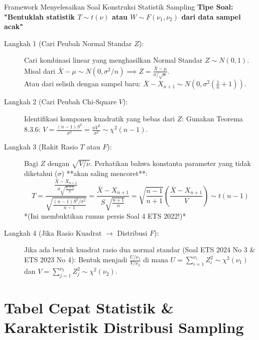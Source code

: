 \documentclass[10pt,twoside]{article}
\begin{document}
\begin{stepbox}{Framework Menyelesaikan Soal Konstruksi Statistik Sampling}
\textbf{Tipe Soal: "Bentuklah statistik $T \sim t(\nu)$ atau $W \sim F(\nu_1, \nu_2)$ dari data sampel acak"}
\begin{description}
  \item[Langkah 1 (Cari Peubah Normal Standar $Z$):]
    Cari kombinasi linear yang menghasilkan Normal Standar $Z \sim N(0, 1)$.
    Misal dari $\bar{X} - \mu \sim N(0, \sigma^2/n) \implies Z = \frac{\bar{X} - \mu}{\sigma/\sqrt{n}}$.\\
    Atau dari selisih dengan sampel baru: $\bar{X} - X_{n+1} \sim N\left(0, \sigma^2\left(\frac{1}{n} + 1\right)\right)$.
  \item[Langkah 2 (Cari Peubah Chi-Square $V$):]
    Identifikasi komponen kuadratik yang bebas dari $Z$:
    Gunakan Teorema 8.3.6: $V = \frac{(n-1)S^2}{\sigma^2} = \frac{n V^2}{\sigma^2} \sim \chi^2(n-1)$.
  \item[Langkah 3 (Rakit Rasio $T$ atau $F$):]
    Bagi $Z$ dengan $\sqrt{V/\nu}$. Perhatikan bahwa konstanta parameter yang tidak diketahui ($\sigma$) **akan saling mencoret**:
    $$T = \frac{\frac{\bar{X} - X_{n+1}}{\sigma\sqrt{\frac{n+1}{n}}}}{\sqrt{\frac{(n-1)S^2/\sigma^2}{n-1}}} = \frac{\bar{X} - X_{n+1}}{S\sqrt{\frac{n+1}{n}}} = \sqrt{\frac{n-1}{n+1}}\left(\frac{\bar{X} - X_{n+1}}{V}\right) \sim t(n-1)$$
    *(Ini membuktikan rumus persis Soal 4 ETS 2022!)*
  \item[Langkah 4 (Jika Rasio Kuadrat $\to$ Distribusi $F$):]
    Jika ada bentuk kuadrat rasio dua normal standar (Soal ETS 2024 No 3 \& ETS 2023 No 4):
    Bentuk menjadi $\frac{U / \nu_1}{V / \nu_2}$ di mana $U = \sum_{i=1}^{\nu_1} Z_i^2 \sim \chi^2(\nu_1)$ dan $V = \sum_{j=1}^{\nu_2} Z_j^2 \sim \chi^2(\nu_2)$.
\end{description}
\end{stepbox}

\section{Tabel Cepat Statistik \& Karakteristik Distribusi Sampling}
\end{document}
